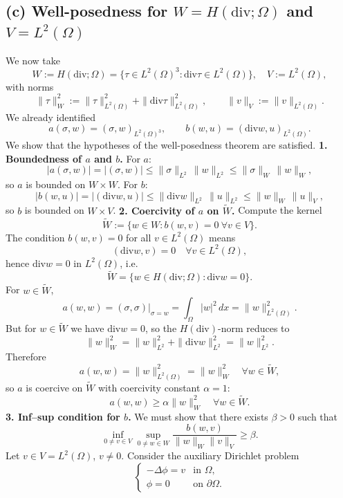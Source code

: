 \subsection*{(c) Well-posedness for $W = H(\mathrm{div};\Omega)$ and $V = L^2(\Omega)$}
We now take
\[
    W := H(\mathrm{div};\Omega)
    = \{\tau \in L^2(\Omega)^3 : \mathrm{div} \tau \in L^2(\Omega)\},
    \quad
    V := L^2(\Omega),
\]
with norms
\[
    \|\tau\|_W^2 := \|\tau\|_{L^2(\Omega)}^2 + \|\mathrm{div} \tau\|_{L^2(\Omega)}^2,
    \qquad
    \|v\|_V := \|v\|_{L^2(\Omega)}.
\]
We already identified
\[
    a(\sigma,w) = (\sigma,w)_{L^2(\Omega)^3},
    \qquad
    b(w,u) = (\mathrm{div} w, u)_{L^2(\Omega)}.
\]
We show that the hypotheses of the well-posedness theorem are satisfied.
\textbf{1. Boundedness of $a$ and $b$.}
For $a$:
\[
    |a(\sigma,w)|
    = |(\sigma,w)|
    \le \|\sigma\|_{L^2}\,\|w\|_{L^2}
    \le \|\sigma\|_W\,\|w\|_W,
\]
so $a$ is bounded on $W\times W$.
For $b$:
\[
    |b(w,u)|
    = |(\mathrm{div} w,u)|
    \le \|\mathrm{div} w\|_{L^2}\,\|u\|_{L^2}
    \le \|w\|_W\,\|u\|_V,
\]
so $b$ is bounded on $W\times V$.
\textbf{2. Coercivity of $a$ on $\widetilde W$.}
Compute the kernel
\[
    \widetilde W := \{ w\in W : b(w,v) = 0\ \forall v\in V\}.
\]
The condition $b(w,v)=0$ for all $v\in L^2(\Omega)$ means
\[
    (\mathrm{div} w,v) = 0 \quad\forall v\in L^2(\Omega),
\]
hence $\mathrm{div} w = 0$ in $L^2(\Omega)$, i.e.
\[
    \widetilde W
    = \{ w\in H(\mathrm{div};\Omega) : \mathrm{div} w = 0\}.
\]
For $w\in\widetilde W$,
\[
    a(w,w)
    = (\sigma,\sigma)\big|_{\sigma=w}
    = \int_\Omega |w|^2\,dx
    = \|w\|_{L^2(\Omega)}^2.
\]
But for $w\in\widetilde W$ we have $\mathrm{div} w = 0$, so the $H(\mathrm{div})$-norm reduces to
\[
    \|w\|_W^2 = \|w\|_{L^2}^2 + \|\mathrm{div} w\|_{L^2}^2 = \|w\|_{L^2}^2.
\]
Therefore
\[
    a(w,w) = \|w\|_{L^2(\Omega)}^2 = \|w\|_W^2
    \quad\forall w\in\widetilde W,
\]
so $a$ is coercive on $\widetilde W$ with coercivity constant $\alpha = 1$:
\[
    a(w,w) \ge \alpha\|w\|_W^2 \quad\forall w\in\widetilde W.
\]
\textbf{3. Inf--sup condition for $b$.}
We must show that there exists $\beta>0$ such that
\[
    \inf_{0\neq v\in V}
    \sup_{0\neq w\in W}
    \frac{b(w,v)}{\|w\|_W \|v\|_V}
    \ge \beta.
\]
Let $v\in V=L^2(\Omega)$, $v\neq 0$. Consider the auxiliary Dirichlet problem
\[
    \begin{cases}
        - \Delta \phi = v & \text{in } \Omega,         \\
        \phi = 0          & \text{on } \partial\Omega.
    \end{cases}
\]
